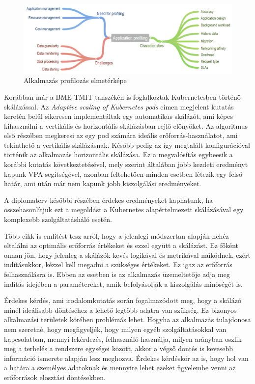 \begin{figure}[!ht]
\centering
\includegraphics[width=150mm, keepaspectratio]{figures/applicationprofiling.png}
\caption{Alkalmazás profilozás elmetérképe\citep{CloudResourceManagement}}
\label{fig:applicationprofiling}
\end{figure}

Korábban már a BME TMIT tanszékén is foglalkoztak Kubernetesben történő skálázással. 
Az \emph{Adaptive scaling of Kubernetes pods}\cite{AdaptiveScalingOfPods} címen megjelent kutatás keretén belül sikeresen implementáltak egy automatikus skálázót, ami képes kihasználni a vertikális és horizontális skálázásban rejlő előnyöket. 
Az algoritmus első részében megkeresi az egy pod számára ideális erőforrás-használatot, ami tekinthető a vertikális skálázásnak. 
Később pedig az így megtalált konfigurációval történik az alkalmazás horizontális skálázása. 
Ez a megvalósítás egybeesik a korábbi kutatás következtetésével\citep{bscThesis}, mely szerint általában jobb kezdeti eredményt kapunk VPA segítségével, azonban feltehetően minden esetben létezik egy felső határ, ami után már nem kapunk jobb kiszolgálási eredményeket. 

A diplomaterv későbbi részében érdekes eredményeket kaphatunk, ha összehasonlítjuk ezt a megoldást a Kubernetes alapértelmezett skálázásával egy komplexebb szolgáltatásháló esetén.

Több cikk\cite{AdaptiveScalingOfPods}\citep{PredictingUsageAndProactiveScaling} is említést tesz
arról, hogy a jelenlegi módszertan alapján nehéz eltalálni az optimális erőforrás értékeket és ezzel
együtt a skálázást. Ez főként onnan jön, hogy jelenleg a skálázók kevés logikával és metrikával
működnek, ezért indításukkor, kézzel kell megadni a szükséges értékeket. Ez igaz az erőforrás
felhasználásra is. Ebben az esetben is az alkalmazás üzemeltetője adja meg indítás idejében a
paramétereket, amik befolyásolják a kiszolgálás minőségét is. 

Érdekes kérdés, ami irodalomkutatás során fogalmazódott meg, hogy a skálázó minél ideálisabb döntéséhez a lehető legtöbb adatra van szükség.
Ez bizonyos alkalmazási területek körében problémás lehet.
Hogyha az alkalmazás tulajdonosa nem szeretné, hogy megfigyeljék, hogy milyen egyéb szolgáltatásokkal van kapcsolatban, mennyi lekérdezés, felhasználó használja, milyen arányban oszlik meg a terhelés a rendszere egységei között, akkor a végső döntés is kevesebb információ ismerete alapján lesz meghozva.
Érdekes kérdéskör az is, hogy hol van a határa a személyes adatoknak és mennyire lehet ezeket figyelembe venni az erőforrások elosztási döntésekben.

